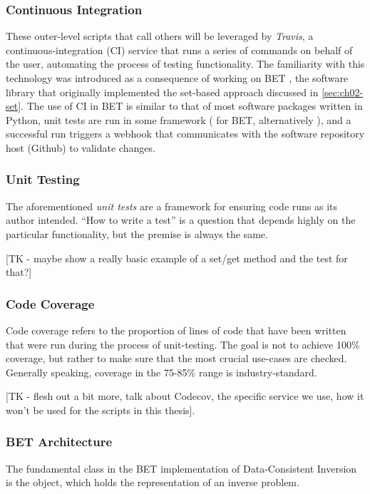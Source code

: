 \subsubsection{Continuous Integration}\label{sec:continuous-integration}
These outer-level scripts that call others will be leveraged by \emph{Travis}, a continuous-integration (CI) service that runs a series of commands on behalf of the user, automating the process of testing functionality. 
The familiarity with this technology was introduced as a consequence of working on BET \cite{pyBET}, the software library that originally implemented the set-based approach discussed in \ref{sec:ch02-set}.
The use of CI in BET is similar to that of most software packages written in Python, unit tests are run in some framework ( for BET, alternatively ), and a successful run triggers a webhook that communicates with the software repository host (Github) to validate changes.

\subsubsection{Unit Testing}\label{sec:unit-testing}
The aforementioned \emph{unit tests} are a framework for ensuring code runs as its author intended.
``How to write a test'' is a question that depends highly on the particular functionality, but the premise is always the same.

[TK - maybe show a really basic example of a set/get method and the test for that?] 


\subsubsection{Code Coverage}\label{sec:code-coverage}
Code coverage refers to the proportion of lines of code that have been written that were run during the process of unit-testing. 
The goal is not to achieve 100\% coverage, but rather to make sure that the most crucial use-cases are checked.
Generally speaking, coverage in the 75-85\% range is industry-standard.

[TK - flesh out a bit more, talk about Codecov, the specific service we use, how it won't be used for the scripts in this thesis]. 

\subsubsection{BET Architecture}\label{sec:bet-architecture-overview}
The fundamental class in the BET implementation of Data-Consistent Inversion is the  object, which holds the representation of an inverse problem.

